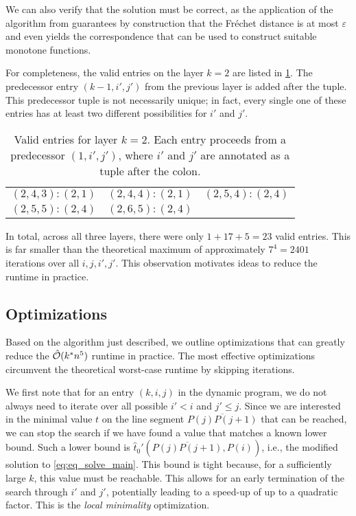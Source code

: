 We can also verify that the solution must be correct, as the application of the algorithm from \citeauthor{computing_the_frechet_distance_between_two_polygonal_curves} guarantees by construction that the Fréchet distance is at most \(\varepsilon\) and even yields the correspondence that can be used to construct suitable monotone functions.

For completeness, the valid entries on the layer \(k = 2\) are listed in \cref{tab:exlayer2}. The predecessor entry \((k - 1, i', j')\) from the previous layer is added after the tuple. This predecessor tuple is not necessarily unique; in fact, every single one of these entries has at least two different possibilities for \(i'\) and \(j'\).
\begin{table}[ht]
\centering
\begin{tabular}{|ccc|}
\hline
$(2,4,3):(2, 1)$ & $(2,4,4):(2, 1)$ & $(2,5,4):(2,4)$ \\
$(2,5,5):(2,4)$ & $(2,6,5):(2,4)$ & \\
\hline
\end{tabular}
	\caption{Valid entries for layer \(k = 2\). Each entry proceeds from a predecessor \((1, i', j')\), where \(i'\) and \(j'\) are annotated as a tuple after the colon.}
\label{tab:exlayer2}
\end{table}

In total, across all three layers, there were only \(1 + 17 + 5 = 23\) valid entries. This is far smaller than the theoretical maximum of approximately \(7^4 = 2401\) iterations over all \(i, j, i', j'\). This observation motivates ideas to reduce the runtime in practice.

\subsection{Optimizations}
\label{ssec:optimizations}
Based on the algorithm just described, we outline optimizations that can greatly reduce the \(\hat{\mathcal{O}}(k^*n^5)\) runtime in practice. The most effective optimizations circumvent the theoretical worst-case runtime by skipping iterations.

We first note that for an entry \((k, i, j)\) in the dynamic program, we do not always need to iterate over all possible \(i' < i\) and \(j' \leq j\). Since we are interested in the minimal value \(t\) on the line segment \(\overline{P(j)P(j+1)}\) that can be reached, we can stop the search if we have found a value that matches a known lower bound. Such a lower bound is \(\hat t_0'(\overline{P(j)P(j+1)}, P(i))\), i.e., the modified solution to \cref{eq:eq_solve_main}. This bound is tight because, for a sufficiently large \(k\), this value must be reachable. This allows for an early termination of the search through \(i'\) and \(j'\), potentially leading to a speed-up of up to a quadratic factor. This is the \emph{local minimality} optimization.

